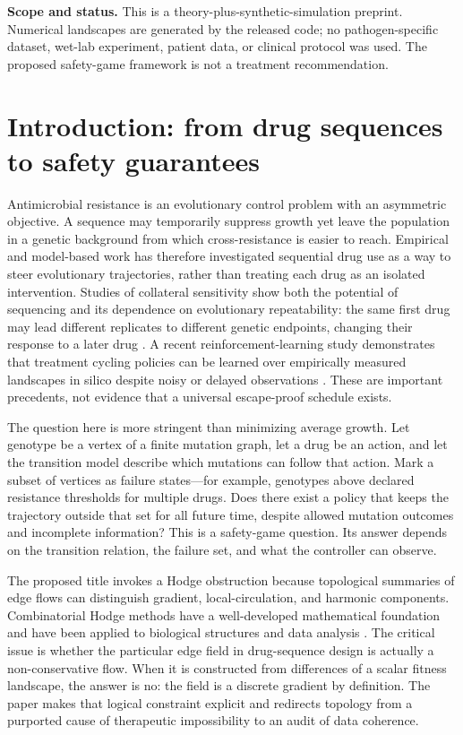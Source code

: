 \documentclass[11pt]{article}
\theoremstyle{definition}\newtheorem{definition}[proposition]{Definition}\theoremstyle{remark}\newtheorem{remark}[proposition]{Remark}
\begin{document}
\begin{caveatbox}\textbf{Scope and status.} This is a theory-plus-synthetic-simulation preprint. Numerical landscapes are generated by the released code; no pathogen-specific dataset, wet-lab experiment, patient data, or clinical protocol was used. The proposed safety-game framework is not a treatment recommendation.\end{caveatbox}
\tableofcontents\clearpage\label{maintext-start}

\section{Introduction: from drug sequences to safety guarantees}
Antimicrobial resistance is an evolutionary control problem with an asymmetric objective. A sequence may temporarily suppress growth yet leave the population in a genetic background from which cross-resistance is easier to reach. Empirical and model-based work has therefore investigated sequential drug use as a way to steer evolutionary trajectories, rather than treating each drug as an isolated intervention. Studies of collateral sensitivity show both the potential of sequencing and its dependence on evolutionary repeatability: the same first drug may lead different replicates to different genetic endpoints, changing their response to a later drug \citep{Nichol2019,MaltasWood2019,ArdellKryazhimskiy2021}. A recent reinforcement-learning study demonstrates that treatment cycling policies can be learned over empirically measured landscapes in silico despite noisy or delayed observations \citep{Weaver2024}. These are important precedents, not evidence that a universal escape-proof schedule exists.

The question here is more stringent than minimizing average growth. Let genotype be a vertex of a finite mutation graph, let a drug be an action, and let the transition model describe which mutations can follow that action. Mark a subset of vertices as failure states—for example, genotypes above declared resistance thresholds for multiple drugs. Does there exist a policy that keeps the trajectory outside that set for all future time, despite allowed mutation outcomes and incomplete information? This is a safety-game question. Its answer depends on the transition relation, the failure set, and what the controller can observe.

The proposed title invokes a Hodge obstruction because topological summaries of edge flows can distinguish gradient, local-circulation, and harmonic components. Combinatorial Hodge methods have a well-developed mathematical foundation and have been applied to biological structures and data analysis \citep{Jiang2011,Koh2022}. The critical issue is whether the particular edge field in drug-sequence design is actually a non-conservative flow. When it is constructed from differences of a scalar fitness landscape, the answer is no: the field is a discrete gradient by definition. The paper makes that logical constraint explicit and redirects topology from a purported cause of therapeutic impossibility to an audit of data coherence.
\end{document}
